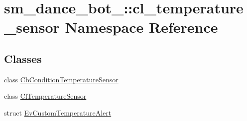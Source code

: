 \hypertarget{namespacesm__dance__bot__2_1_1cl__temperature__sensor}{}\section{sm\+\_\+dance\+\_\+bot\+\_\+:\+:cl\+\_\+temperature\+\_\+sensor Namespace Reference}
\label{namespacesm__dance__bot__2_1_1cl__temperature__sensor}
\subsection*{Classes}
\begin{DoxyCompactItemize}
\item 
class \hyperlink{classsm__dance__bot__2_1_1cl__temperature__sensor_1_1CbConditionTemperatureSensor}{Cb\+Condition\+Temperature\+Sensor}
\item 
class \hyperlink{classsm__dance__bot__2_1_1cl__temperature__sensor_1_1ClTemperatureSensor}{Cl\+Temperature\+Sensor}
\item 
struct \hyperlink{structsm__dance__bot__2_1_1cl__temperature__sensor_1_1EvCustomTemperatureAlert}{Ev\+Custom\+Temperature\+Alert}
\end{DoxyCompactItemize}
